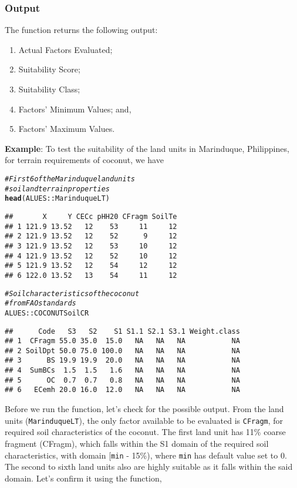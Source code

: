 \documentclass[11pt,fleqn]{article}\usepackage[]{graphicx}\usepackage[]{color}
\makeatletter
\newcommand{\hlcom}[1]{\textcolor[rgb]{0.678,0.584,0.686}{\textit{#1}}}%
\newcommand{\hlstd}[1]{\textcolor[rgb]{0.345,0.345,0.345}{#1}}%
\newcommand{\hlkwd}[1]{\textcolor[rgb]{0.737,0.353,0.396}{\textbf{#1}}}%
\newenvironment{kframe}{%
 \def\at@end@of@kframe{}%
 \ifinner\ifhmode%
  \def\at@end@of@kframe{\end{minipage}}%
  \begin{minipage}{\columnwidth}%
 \fi\fi%
 \def\FrameCommand##1{\hskip\@totalleftmargin \hskip-\fboxsep
 \colorbox{shadecolor}{##1}\hskip-\fboxsep
     \hskip-\linewidth \hskip-\@totalleftmargin \hskip\columnwidth}%
 \MakeFramed {\advance\hsize-\width
   \@totalleftmargin\z@ \linewidth\hsize
   \@setminipage}}%
 {\par\unskip\endMakeFramed%
 \at@end@of@kframe}
\newenvironment{knitrout}{}{} %
\makeatother
\begin{document}
\subsubsection*{Output}
The function returns the following output:
\begin{enumerate}
\item Actual Factors Evaluated;
\item Suitability Score;
\item Suitability Class;
\item Factors' Minimum Values; and,
\item Factors' Maximum Values.
\end{enumerate}
\textbf{Example}: To test the suitability of the land units in Marinduque, Philippines, for terrain requirements of coconut, we have
\begin{knitrout}
\color{fgcolor}\begin{kframe}
\begin{alltt}
\hlcom{# First 6 of the Marinduque land units }
\hlcom{# soil and terrain properties}
\hlkwd{head}\hlstd{(ALUES::MarinduqueLT)}
\end{alltt}
\begin{verbatim}
##       X     Y CECc pHH20 CFragm SoilTe
## 1 121.9 13.52   12    53     11     12
## 2 121.9 13.52   12    52      9     12
## 3 121.9 13.52   12    53     10     12
## 4 121.9 13.52   12    52     10     12
## 5 121.9 13.52   12    54     12     12
## 6 122.0 13.52   13    54     11     12
\end{verbatim}
\begin{alltt}
\hlcom{# Soil characteristics of the coconut}
\hlcom{# from FAO standards}
\hlstd{ALUES::COCONUTSoilCR}
\end{alltt}
\begin{verbatim}
##      Code   S3   S2    S1 S1.1 S2.1 S3.1 Weight.class
## 1  CFragm 55.0 35.0  15.0   NA   NA   NA           NA
## 2 SoilDpt 50.0 75.0 100.0   NA   NA   NA           NA
## 3      BS 19.9 19.9  20.0   NA   NA   NA           NA
## 4  SumBCs  1.5  1.5   1.6   NA   NA   NA           NA
## 5      OC  0.7  0.7   0.8   NA   NA   NA           NA
## 6   ECemh 20.0 16.0  12.0   NA   NA   NA           NA
\end{verbatim}
\end{kframe}
\end{knitrout}
\noindent Before we run the function, let's check for the possible output. From the land units (\verb|MarinduqueLT|), the only factor available to be evaluated is \verb|CFragm|, for required soil characteristics of the coconut. The first land unit has 11\% coarse fragment (CFragm), which falls within the S1 domain of the required soil characteristics, with domain [\verb|min| - 15\%), where \verb|min| has default value set to 0. The second to sixth land units also are highly suitable as it falls within the said domain. Let's confirm it using the function,
\end{document}
